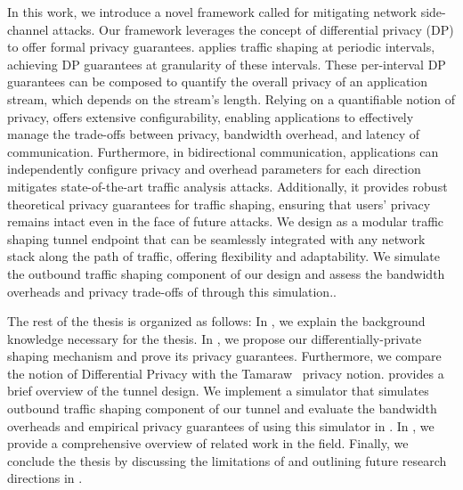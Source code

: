 In this work, we introduce a novel framework called {\sys} for mitigating network side-channel attacks.
Our framework leverages the concept of differential privacy (DP) to offer formal privacy guarantees.
{\sys} applies traffic shaping at periodic intervals, achieving DP guarantees at granularity of these intervals. 
These per-interval DP guarantees can be composed to quantify the overall privacy of an application stream, which depends on the stream's length.
Relying on a quantifiable notion of privacy, {\sys} offers extensive configurability, enabling applications to effectively manage the trade-offs between privacy, bandwidth overhead, and latency of communication.
Furthermore, in bidirectional communication, applications can independently configure privacy and overhead parameters for each direction
{\sys} mitigates state-of-the-art traffic analysis attacks.
Additionally, it provides robust theoretical privacy guarantees for traffic shaping, ensuring that users' privacy remains intact even in the face of future attacks.
We design {\sys} as a modular traffic shaping tunnel endpoint that can be seamlessly integrated with any network stack along the path of traffic, offering flexibility and adaptability.
We simulate the outbound traffic shaping component of our design and assess the bandwidth overheads and privacy trade-offs of {\sys} through this simulation..

The rest of the thesis is organized as follows: 
In , we explain the background knowledge necessary for the thesis.
In , we propose our differentially-private shaping mechanism and prove its privacy guarantees. Furthermore, we compare the notion of Differential Privacy with the Tamaraw~\cite{cai2014systematic} privacy notion.
 provides a brief overview of the tunnel design. 
We implement a simulator that simulates outbound traffic shaping component of our tunnel and evaluate the bandwidth overheads and empirical privacy guarantees of {\sys} using this simulator in .
In , we provide a comprehensive overview of related work in the field.
Finally, we conclude the thesis by discussing the limitations of {\sys} and outlining future research directions in . 


